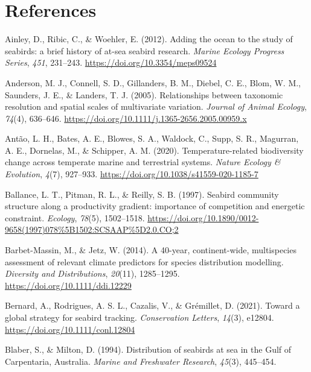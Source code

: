 \documentclass{article}
\newlength{\cslhangindent}
\newlength{\cslentryspacingunit} %
\newenvironment{CSLReferences}[2] %
 {%
  \setlength{\parindent}{0pt}
  \ifodd #1
  \let\oldpar\par
  \def\par{\hangindent=\cslhangindent\oldpar}
  \fi
  \setlength{\parskip}{#2\cslentryspacingunit}
 }%
 {}
\begin{document}
\hypertarget{references}{%
\section{References}\label{references}}

\hypertarget{refs}{}
\begin{CSLReferences}{1}{0}
\leavevmode{}%
Ainley, D., Ribic, C., \& Woehler, E. (2012). Adding the ocean to the study of seabirds: a brief history of at-sea seabird research. \emph{Marine Ecology Progress Series}, \emph{451}, 231--243. \url{https://doi.org/10.3354/meps09524}

\leavevmode{}%
Anderson, M. J., Connell, S. D., Gillanders, B. M., Diebel, C. E., Blom, W. M., Saunders, J. E., \& Landers, T. J. (2005). Relationships between taxonomic resolution and spatial scales of multivariate variation. \emph{Journal of Animal Ecology}, \emph{74}(4), 636--646. \url{https://doi.org/10.1111/j.1365-2656.2005.00959.x}

\leavevmode{}%
Antão, L. H., Bates, A. E., Blowes, S. A., Waldock, C., Supp, S. R., Magurran, A. E., Dornelas, M., \& Schipper, A. M. (2020). Temperature-related biodiversity change across temperate marine and terrestrial systems. \emph{Nature Ecology \& Evolution}, \emph{4}(7), 927--933. \url{https://doi.org/10.1038/s41559-020-1185-7}

\leavevmode{}%
Ballance, L. T., Pitman, R. L., \& Reilly, S. B. (1997). Seabird community structure along a productivity gradient: importance of competition and energetic constraint. \emph{Ecology}, \emph{78}(5), 1502--1518. \url{https://doi.org/10.1890/0012-9658(1997)078\%5B1502:SCSAAP\%5D2.0.CO;2}

\leavevmode{}%
Barbet-Massin, M., \& Jetz, W. (2014). A 40-year, continent-wide, multispecies assessment of relevant climate predictors for species distribution modelling. \emph{Diversity and Distributions}, \emph{20}(11), 1285--1295. \url{https://doi.org/10.1111/ddi.12229}

\leavevmode{}%
Bernard, A., Rodrigues, A. S. L., Cazalis, V., \& Grémillet, D. (2021). Toward a global strategy for seabird tracking. \emph{Conservation Letters}, \emph{14}(3), e12804. \url{https://doi.org/10.1111/conl.12804}

\leavevmode{}%
Blaber, S., \& Milton, D. (1994). Distribution of seabirds at sea in the {G}ulf of {C}arpentaria, {A}ustralia. \emph{Marine and Freshwater Research}, \emph{45}(3), 445--454.


\end{CSLReferences}
\end{document}
